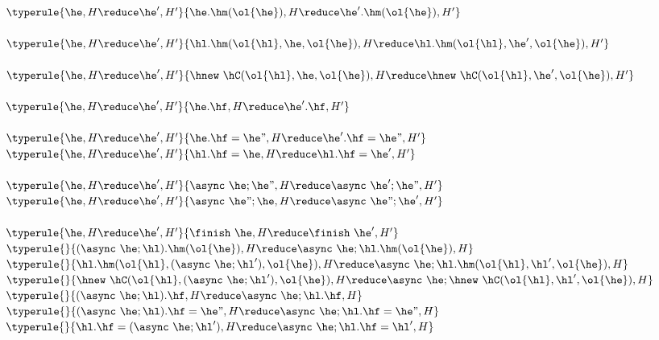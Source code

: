 $\typerule{
    \he,H \reduce \he',H'
}{
  \he.\hm(\ol{\he}),H \reduce \he'.\hm(\ol{\he}),H'
}$~
\\\\
$\typerule{
    \he,H \reduce \he',H'
}{
  \hl.\hm(\ol{\hl},\he,\ol{\he}),H \reduce \hl.\hm(\ol{\hl},\he',\ol{\he}),H'
}$~
\\\\
$\typerule{
    \he,H \reduce \he',H'
}{
  \hnew ~ \hC(\ol{\hl},\he,\ol{\he}),H \reduce \hnew ~ \hC(\ol{\hl},\he',\ol{\he}),H'
}$~
\\\\
$\typerule{
    \he,H \reduce \he',H'
}{
  \he.\hf,H \reduce \he'.\hf,H'
}$~
\\\\
$\typerule{
    \he,H \reduce \he',H'
}{
  \he.\hf=\he",H \reduce \he'.\hf=\he",H'
}$~
\qquad
$\typerule{
    \he,H \reduce \he',H'
}{
  \hl.\hf=\he,H \reduce \hl.\hf=\he',H'
}$~
\\\\
$\typerule{
    \he,H \reduce \he',H'
}{
  \async~\he;\he",H \reduce \async~\he';\he",H'
}$~
\qquad
$\typerule{
    \he,H \reduce \he',H'
}{
  \async~\he";\he,H \reduce \async~\he";\he',H'
}$~
\\\\
$\typerule{
    \he,H \reduce \he',H'
}{
  \finish~\he,H \reduce \finish~\he',H'
}$~
\\

$\typerule{
}{
  (\async~\he;\hl).\hm(\ol{\he}),H \reduce \async~\he; \hl.\hm(\ol{\he}),H
}$~
\\
$\typerule{
}{
  \hl.\hm(\ol{\hl},(\async~\he;\hl'),\ol{\he}),H \reduce \async~\he; \hl.\hm(\ol{\hl},\hl',\ol{\he}),H
}$~
\\
$\typerule{
}{
  \hnew ~ \hC(\ol{\hl},(\async~\he;\hl'),\ol{\he}),H \reduce \async~\he; \hnew ~ \hC(\ol{\hl},\hl',\ol{\he}),H
}$~
\\
$\typerule{
}{
  (\async~\he;\hl).\hf,H \reduce \async~\he; \hl.\hf,H
}$~
\\
$\typerule{
}{
  (\async~\he;\hl).\hf=\he",H \reduce \async~\he; \hl.\hf=\he",H
}$~
\\
$\typerule{
}{
  \hl.\hf=(\async~\he;\hl'),H \reduce \async~\he; \hl.\hf=\hl',H
}$~
\\\\




























